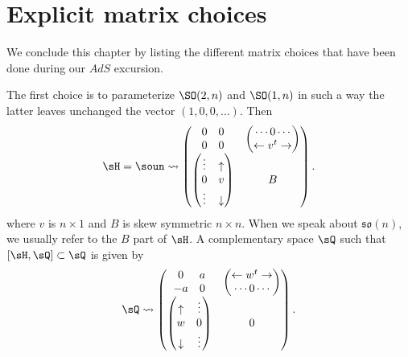 \section{Explicit matrix choices}\label{sec_calc}

We conclude this chapter by listing the different matrix choices that have been done during our $AdS$ excursion.

The first choice is to parameterize $\SO(2,n)$ and $\SO(1,n)$ in such a way the latter leaves unchanged the vector $(1,0,0,\ldots)$. Then
\begin{equation}  \label{eq:mtrH}
\sH=\soun\leadsto
  \begin{pmatrix}
     \begin{matrix}
       0&0\\
       0&0
     \end{matrix}
                       &  \begin{pmatrix}
                     \cdots 0\cdots\\
                \leftarrow v^t\rightarrow
                          \end{pmatrix}\\
    \begin{pmatrix}
       \vdots & \uparrow\\
         0    & v \\
       \vdots & \downarrow
    \end{pmatrix} &  B
  \end{pmatrix}.
\end{equation}
where  $v$ is $n\times 1$ and $B$ is skew symmetric $n\times n$.  When we speak about $\mathfrak{so}(n)$, we usually refer to the $B$ part of $\sH$.  A complementary space $\sQ$ such that $[\sH,\sQ]\subset\sQ$ is given by
\begin{equation}
\sQ\leadsto
 \begin{pmatrix}
     \begin{matrix}
       0&a\\
       -a&0
     \end{matrix}
                       &  \begin{pmatrix}
              \leftarrow w^t\rightarrow \\
                 \cdots 0\cdots\\
                          \end{pmatrix}\\
    \begin{pmatrix}
      \uparrow   & \vdots\\
          w      &  0\\
      \downarrow & \vdots
    \end{pmatrix} & 0
  \end{pmatrix}.
\end{equation}
